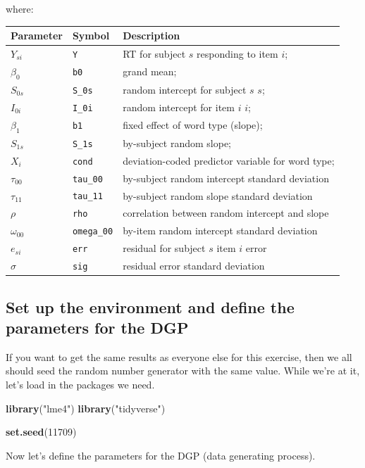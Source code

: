 \documentclass[]{book}
\newenvironment{Shaded}{\begin{snugshade}}{\end{snugshade}}
\newcommand{\DecValTok}[1]{\textcolor[rgb]{0.00,0.00,0.81}{#1}}
\newcommand{\KeywordTok}[1]{\textcolor[rgb]{0.13,0.29,0.53}{\textbf{#1}}}
\newcommand{\NormalTok}[1]{#1}
\newcommand{\StringTok}[1]{\textcolor[rgb]{0.31,0.60,0.02}{#1}}
\begin{document}
where:

\begin{longtable}[]{@{}lll@{}}
\toprule
Parameter & Symbol & Description\tabularnewline
\midrule
\endhead
\(Y_{si}\) & \texttt{Y} & RT for subject \(s\) responding to item \(i\);\tabularnewline
\(\beta_0\) & \texttt{b0} & grand mean;\tabularnewline
\(S_{0s}\) & \texttt{S\_0s} & random intercept for subject \(s\) \(s\);\tabularnewline
\(I_{0i}\) & \texttt{I\_0i} & random intercept for item \(i\) \(i\);\tabularnewline
\(\beta_1\) & \texttt{b1} & fixed effect of word type (slope);\tabularnewline
\(S_{1s}\) & \texttt{S\_1s} & by-subject random slope;\tabularnewline
\(X_{i}\) & \texttt{cond} & deviation-coded predictor variable for word type;\tabularnewline
\(\tau_{00}\) & \texttt{tau\_00} & by-subject random intercept standard deviation\tabularnewline
\(\tau_{11}\) & \texttt{tau\_11} & by-subject random slope standard deviation\tabularnewline
\(\rho\) & \texttt{rho} & correlation between random intercept and slope\tabularnewline
\(\omega_{00}\) & \texttt{omega\_00} & by-item random intercept standard deviation\tabularnewline
\(e_{si}\) & \texttt{err} & residual for subject \(s\) item \(i\) error\tabularnewline
\(\sigma\) & \texttt{sig} & residual error standard deviation\tabularnewline
\bottomrule
\end{longtable}

\hypertarget{set-up-the-environment-and-define-the-parameters-for-the-dgp}{%
\subsection{Set up the environment and define the parameters for the DGP}\label{set-up-the-environment-and-define-the-parameters-for-the-dgp}}

If you want to get the same results as everyone else for this exercise, then we all should seed the random number generator with the same value. While we're at it, let's load in the packages we need.

\begin{Shaded}
\begin{Highlighting}[]
\KeywordTok{library}\NormalTok{(}\StringTok{"lme4"}\NormalTok{)}
\KeywordTok{library}\NormalTok{(}\StringTok{"tidyverse"}\NormalTok{)}

\KeywordTok{set.seed}\NormalTok{(}\DecValTok{11709}\NormalTok{)  }
\end{Highlighting}
\end{Shaded}

Now let's define the parameters for the DGP (data generating process).
\end{document}
